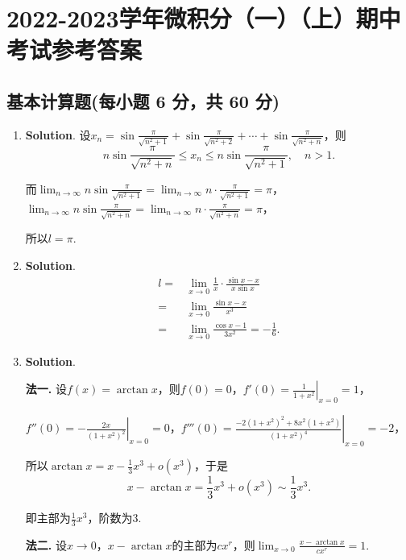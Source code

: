 \documentclass[../Main.tex]{subfiles}
\begin{document}
\chapter{2022-2023学年微积分（一）（上）期中考试参考答案}
\section{基本计算题(每小题 6 分，共 60 分)}
\begin{enumerate}
    \item \textbf{Solution}. 设$x_{n}=\sin\frac{\pi}{\sqrt{n^{2}+1}}+\sin\frac{\pi}{\sqrt{n^{2}+2}}
              +\cdots+\sin\frac{\pi}{\sqrt{n^{2}+n}}$，则
          \[
              n\sin\frac{\pi}{\sqrt{n^{2}+n}}\leq x_{n} \leq n\sin\frac{\pi}{\sqrt{n^{2}+1}}
              ,\quad n>1.
          \]

          而$\lim_{n\to\infty}n\sin\frac{\pi}{\sqrt{n^{2}+1}}=\lim_{n\to\infty}n\cdot
              \frac{\pi}{\sqrt{n^{2}+1}}=\pi$，$\lim_{n\to\infty}n\sin\frac{\pi}{\sqrt{n^{2}+n}}
              =\lim_{n\to\infty}n\cdot\frac{\pi}{\sqrt{n^{2}+n}}=\pi$，

          所以$l=\pi$.

    \item \textbf{Solution}.
          \[
              \begin{aligned}
                  l= & \lim_{x\to 0}\frac{1}{x}\cdot\frac{\sin x-x}{x\sin x} \\
                  =  & \lim_{x\to0}\frac{\sin x-x}{x^3}                      \\
                  =  & \lim_{x\to0}\frac{\cos x-1}{3x^2}=-\frac{1}{6}.
              \end{aligned}
          \]

    \item \textbf{Solution}.

          \textbf{法一.} 设$f(x)=\arctan x$，则$f(0)=0$，$f'(0)=\left.\frac{1}{1+x^{2}}
              \right|_{x=0}=1$，

          $f''(0)=\left.-\frac{2x}{(1+x^{2})^{2}}\right|_{x=0}=0$，$f'''(0)=\left.\frac{-2(1+x^{2})^{2}+8x^{2}(1+x^{2})}{(1+x^{2})^{4}}
              \right|_{x=0}=-2$，

          所以$\arctan x=x-\frac{1}{3}x^{3}+o(x^{3})$，于是
          \[
              x-\arctan x=\frac{1}{3}x^{3}+o(x^{3})\sim\frac{1}{3}x^{3}.
          \]

          即主部为$\frac{1}{3}x^{3}$，阶数为$3$.

          \textbf{法二.} 设$x\to0$，$x-\arctan x$的主部为$cx^{r}$，则$\lim_{x\to0}\frac{x-\arctan
                  x}{cx^{r}}=1$.


\end{enumerate}
\end{document}
